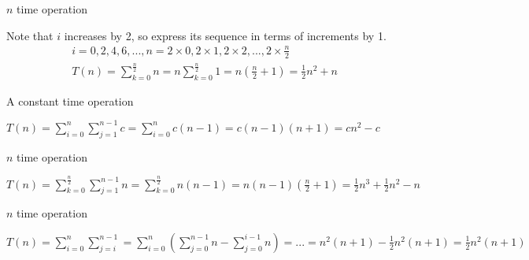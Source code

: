 \begin{multicols}{2}
  \noindent \hrulefill
  \begin{algorithmic}[1]
    \State $n$ time operation
    \EndFor
  \end{algorithmic}
  \noindent \hrulefill

  \noindent Note that $i$ increases by 2, so express its sequence in terms of increments by 1.
  \begin{align*}
    i = 0, 2, 4, 6, ..., n = 2 \times 0, 2 \times 1, 2 \times 2, ..., 2 \times \frac{n}{2} \\
    T(n) = \sum_{k=0}^{\frac{n}{2}} n = n \sum_{k=0}^{\frac{n}{2}} 1 = n (\frac{n}{2} + 1) = \frac{1}{2} n^2 + n
  \end{align*}

  \columnbreak

  \noindent \hrulefill
  \begin{algorithmic}[1]
    \State A constant time operation
    \EndFor
    \EndFor
  \end{algorithmic}
  \noindent \hrulefill

  $T(n) = \sum_{i=0}^{n} \sum_{j=1}^{n-1} c = \sum_{i=0}^{n} c(n - 1) = c(n - 1)(n+1) = cn^2 - c$
\end{multicols}

\begin{multicols}{2}
  \noindent \hrulefill
  \begin{algorithmic}[1]
    \State $n$ time operation
    \EndFor
    \EndFor
  \end{algorithmic}
  \noindent \hrulefill

  $T(n) = \sum_{k=0}^{\frac{n}{2}} \sum_{j=1}^{n-1} n = \sum_{k=0}^{\frac{n}{2}} n(n - 1) = n(n - 1)(\frac{n}{2} + 1) = \frac{1}{2} n^3 + \frac{1}{2} n^2 - n$

  \columnbreak

  \noindent \hrulefill
  \begin{algorithmic}[1]
    \State $n$ time operation
    \EndFor
    \EndFor
  \end{algorithmic}
  \noindent \hrulefill

  $T(n) = \sum_{i=0}^{n} \sum_{j=i}^{n-1} = \sum_{i=0}^{n} (\sum_{j=0}^{n-1} n - \sum_{j=0}^{i-1} n) = ... = n^2 (n + 1) - \frac{1}{2} n^2 (n+1) = \frac{1}{2} n^2 (n+1)$
\end{multicols}

